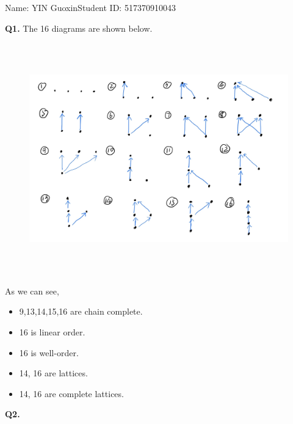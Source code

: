 \documentclass{article}[12pt]
\begin{document}
\noindent

\noindent{}
\begin{center}
\footnotesize{\quad Name: YIN Guoxin\quad Student ID: 517370910043}


\end{center}

\noindent \textbf{Q1.}
The 16 diagrams are shown below.
\begin{figure}[H]
	\centering
	\includegraphics[width=16cm,height=10cm]{Q1.jpg} 
	\end{figure}
	As we can see, 
	\begin{itemize}
	\item 9,13,14,15,16 are chain complete.
	\item 16 is linear order.
	\item 16 is well-order.
	\item 14, 16 are lattices.
	\item 14, 16 are complete lattices.
	\end{itemize}
\noindent \textbf{Q2.}
\end{document}
